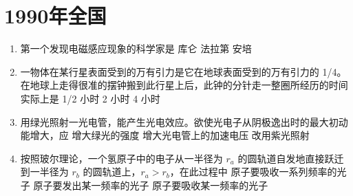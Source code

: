 \documentclass[\gkver]{gaokaozhenti}
\begin{document}
\chapter{1990年全国}

\begin{enumerate}
\item
第一个发现电磁感应现象的科学家是
{库仑}
{法拉第}
{安培}


\item
一物体在某行星表面受到的万有引力是它在地球表面受到的万有引力的 1/4。在地球上走得很准的摆钟搬到此行星上后，此钟的分针走一整圈所经历的时间实际上是
{1/2 小时}
{2 小时}
{4 小时}


\item
用绿光照射一光电管，能产生光电效应。欲使光电子从阴极逸出时的最大初动能增大，应
{增大绿光的强度}
{增大光电管上的加速电压}
{改用紫光照射}


\item
按照玻尔理论，一个氢原子中的电子从一半径为 $r_{a}$ 的圆轨道自发地直接跃迁到一半径为 $r_{b}$ 的圆轨道上，$r_{a} > r_{b}$，在此过程中
{原子要吸收一系列频率的光子}
{原子要发出某一频率的光子}
{原子要吸收某一频率的光子}


\end{enumerate}
\end{document}
